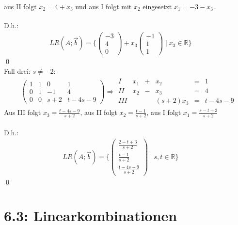\documentclass[titlepage]{article}
\newcommand{\R}{\mathbb{R}}
\begin{document}
	aus II folgt $x_2=4+x_3$ und aus I folgt mit $x_2$ eingesetzt $x_1=-3-x_3$.\\\\ D.h.:
	\begin{align*}
		LR(A;\vec{b})=\{\begin{pmatrix}
			-3\\4\\0
		\end{pmatrix}+x_3\begin{pmatrix}
		-1\\1\\1
	\end{pmatrix}\mid x_3\in\R\}&&
	\end{align*}\qed\\
	Fall drei: $s\neq-2$:
	\begin{align*}
		&\left(\begin{array}{ccc|c}
			1&1&0&1\\
			0&1&-1&4\\
			0&0&s+2&t-4s-9
		\end{array}\right)
		\Rightarrow
		\begin{matrix}
			I&x_1&+&x_2&=&1\\
			II&x_2&-&x_3&=&4\\
			III&&&(s+2)x_3&=&t-4s-9
		\end{matrix}
	\end{align*}
	Aus III folgt $x_3=\frac{t-4s-9}{s+2}$, aus II folgt $x_2=\frac{t-1}{s+2}$, aus I folgt $x_1=\frac{s-t+3}{s+2}$\\\\
	D.h.:
	\begin{align*}
		LR(A;\vec{b})=\{\begin{pmatrix}
		\frac{2-t+3}{s+2}\\\frac{t-1}{s+2}\\\frac{t-4s-9}{s+2}
	\end{pmatrix}\mid s,t\in\R\}&&	
	\end{align*}\qed
	\section*{6.3: Linearkombinationen}
\end{document}
